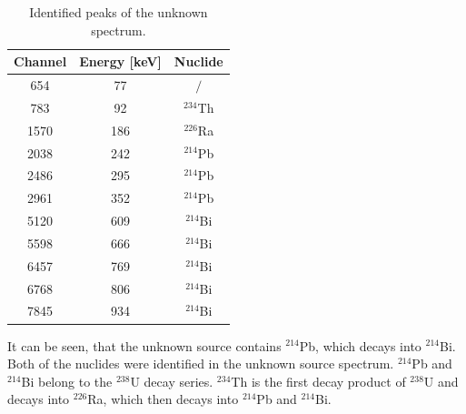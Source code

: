 \begin{table}
    \centering
    \caption{Identified peaks of the unknown spectrum.}
    \label{tab:unknown_peaks}
    \begin{tabular}{c c c}
        \toprule
        Channel & Energy [keV] & Nuclide\\
        \midrule
        654 & 77 & $/$ \\
        783 & 92 & $^{234}$Th \\
        1570 & 186 & $^{226}$Ra \\
        2038 & 242 & $^{214}$Pb \\
        2486 & 295 & $^{214}$Pb \\
        2961 & 352 & $^{214}$Pb \\
        5120 & 609 & $^{214}$Bi \\
        5598 & 666 & $^{214}$Bi \\
        6457 & 769 & $^{214}$Bi \\
        6768 & 806 & $^{214}$Bi \\
        7845 & 934 & $^{214}$Bi \\
        \bottomrule
    \end{tabular} 
\end{table}
It can be seen, that the unknown source contains $^{214}$Pb, which decays into $^{214}$Bi.
Both of the nuclides were identified in the unknown source spectrum.
$^{214}$Pb and $^{214}$Bi belong to the $^{238}$U decay series.
$^{234}$Th is the first decay product of $^{238}$U and decays into $^{226}$Ra, which then decays into $^{214}$Pb and $^{214}$Bi.


